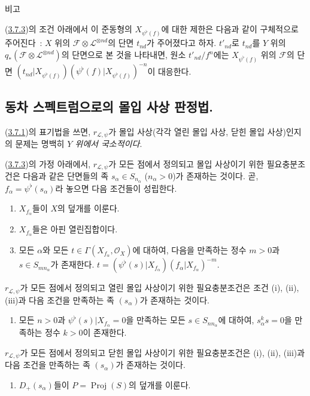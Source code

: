 \begin{namedtheorem}[3.7.9]{비고}
\begin{enumerate}
    (\hyperref[II.3.7.3-ko]{3.7.3})의 조건 아래에서 이 준동형의
    $X_{\psi^\flat(f)}$에 대한 제한은 다음과 같이 구체적으로 주어진다~:
    $X$ 위의 $\mathcal{F}\otimes\mathcal{L}^{\otimes nd}$의 단면
    $t_{nd}$가 주어졌다고 하자. $t'_{nd}$로 $t_{nd}$를 $Y$ 위의
    $q_*(\mathcal{F}\otimes\mathcal{L}^{\otimes nd})$의 단면으로 본 것을
    나타내면, 원소 $t'_{nd}/f^n$에는 $X_{\psi^\flat(f)}$ 위의
    $\mathcal{F}$의 단면
    $(t_{nd}|X_{\psi^\flat(f)})
    (\psi^\flat(f)|X_{\psi^\flat(f)})^{-n}$이 대응한다.
\end{enumerate}
\end{namedtheorem}


\subsection{동차 스펙트럼으로의 몰입 사상 판정법.}
\label{subsection:II.3.8-ko}

\begin{env}[3.8.1]
\label{II.3.8.1-ko}
(\hyperref[II.3.7.1-ko]{3.7.1})의 표기법을 쓰면,
$r_{\mathcal{L},\psi}$가 몰입 사상(각각 열린 몰입 사상, 닫힌 몰입 사상)인지의
문제는 명백히 \emph{$Y$ 위에서 국소적이다}.
\end{env}

\begin{proposition}[3.8.2]
\label{II.3.8.2-ko}
(\hyperref[II.3.7.3-ko]{3.7.3})의 가정 아래에서,
$r_{\mathcal{L},\psi}$가 모든 점에서 정의되고 몰입 사상이기 위한
필요충분조건은 다음과 같은 단면들의 족 $s_\alpha\in S_{n_\alpha}$
($n_\alpha>0$)가 존재하는 것이다. 곧,
$f_\alpha=\psi^\flat(s_\alpha)$라 놓으면 다음 조건들이 성립한다.
\begin{enumerate}
  \item[(i)] $X_{f_\alpha}$들이 $X$의 덮개를 이룬다.
  \item[(ii)] $X_{f_\alpha}$들은 아핀 열린집합이다.
  \item[(iii)] 모든 $\alpha$와 모든
    $t\in\Gamma(X_{f_\alpha},\mathcal{O}_X)$에 대하여, 다음을 만족하는
    정수 $m>0$과 $s\in S_{mn_\alpha}$가 존재한다.
    $t=(\psi^\flat(s)|X_{f_\alpha})(f_\alpha|X_{f_\alpha})^{-m}$.
\end{enumerate}

$r_{\mathcal{L},\psi}$가 모든 점에서 정의되고 열린 몰입 사상이기 위한
필요충분조건은 조건 (i), (ii), (iii)과 다음 조건을 만족하는 족
$(s_\alpha)$가 존재하는 것이다.
\begin{enumerate}
  \item[(iv)] 모든 $n>0$과
    $\psi^\flat(s)|X_{f_\alpha}=0$을 만족하는 모든
    $s\in S_{nn_\alpha}$에 대하여, $s_\alpha^ks=0$을 만족하는 정수
    $k>0$이 존재한다.
\end{enumerate}

$r_{\mathcal{L},\psi}$가 모든 점에서 정의되고 닫힌 몰입 사상이기 위한
필요충분조건은 (i), (ii), (iii)과 다음 조건을 만족하는 족
$(s_\alpha)$가 존재하는 것이다.
\begin{enumerate}
  \item[(v)] $D_+(s_\alpha)$들이
    $P=\operatorname{Proj}(S)$의 덮개를 이룬다.
\end{enumerate}
\end{proposition}

